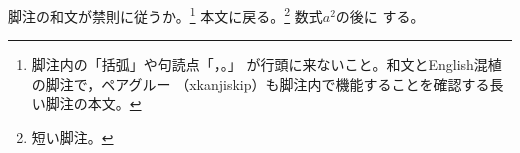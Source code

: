 \documentclass[pdflatex]{jlreq}
\begin{document}
\hsize=200pt
脚注の和文が禁則に従うか。\footnote{脚注内の「括弧」や句読点「，。」
が行頭に来ないこと。和文とEnglish混植の脚注で，ペアグルー
（xkanjiskip）も脚注内で機能することを確認する長い脚注の本文。}
本文に戻る。\footnote{短い脚注。}
\footnotemark 数式$a^2$の後に
する。
\end{document}
